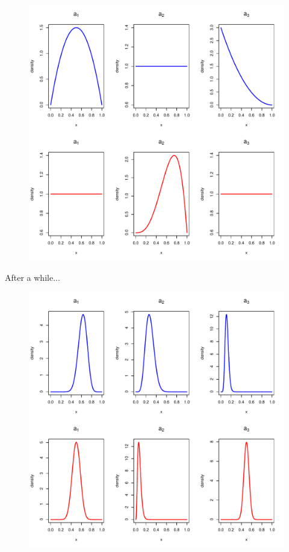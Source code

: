 \documentclass{beamer}
\begin{document}
\begin{frame}
  \begin{figure}
    \includegraphics[scale=.5]{b5.pdf}
  \end{figure}
\end{frame}

\begin{frame}{After a while...}
  \begin{figure}
    \includegraphics[scale=.45]{b6.pdf}
  \end{figure}
\end{frame}
\end{document}
